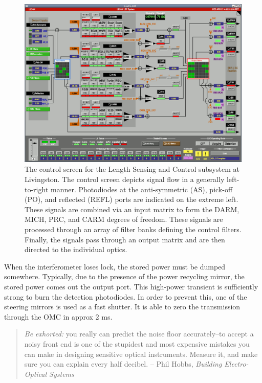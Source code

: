 \begin{figure}
\includegraphics[width=\columnwidth]{figures/L1LSC.png}
\caption{The control screen for the Length Sensing and Control
  subsystem at Livingston.  The control screen depicts signal flow in
  a generally left-to-right manner.  Photodiodes at the anti-symmetric
  (AS), pick-off (PO), and reflected (REFL) ports are indicated on the
  extreme left.  These signals are combined via an input matrix to
  form the DARM, MICH, PRC, and CARM degrees of freedom.  These
  signals are processed through an array of filter banks defining the
  control filters.  Finally, the signals pass through an output matrix
  and are then directed to the individual optics.}
\end{figure}


When the interferometer loses lock, the stored power must be dumped
somewhere. Typically, due to the presence of the power recycling mirror,
the stored power comes out the output port. This high-power transient
is sufficiently strong to burn the detection photodiodes. In order
to prevent this, one of the steering mirrors is used as a fast shutter.
It is able to zero the transmission through the OMC in approx 2 ms.


\begin{quote}
\emph{Be exhorted:} you really can predict the noise floor accurately--to
accept a noisy front end is one of the stupidest and most expensive
mistakes you can make in designing sensitive optical
instruments. Measure it, and make sure you can explain every half
decibel. -- Phil Hobbs, \emph{Building Electro-Optical Systems} \cite{Hobbs2009Building}
\end{quote}
